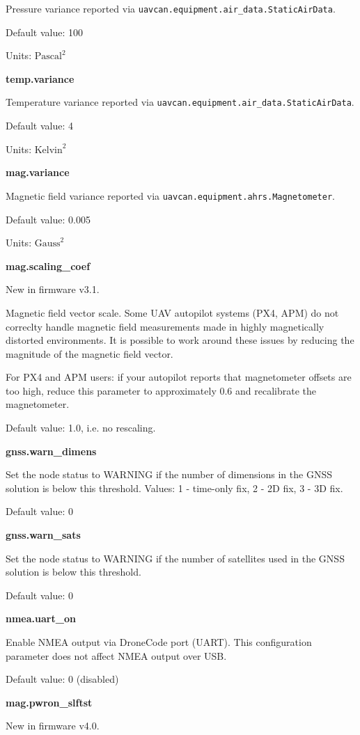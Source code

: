 \documentclass{zubaxdoc}
\begin{document}
Pressure variance reported via \texttt{uavcan.equipment.air{\_}data.StaticAirData}.

Default value: 100

Units: $\text{Pascal}^2$

\textbf{temp.variance}

Temperature variance reported via \texttt{uavcan.equipment.air{\_}data.StaticAirData}.

Default value: 4

Units: $\text{Kelvin}^2$

\textbf{mag.variance}

Magnetic field variance reported via \texttt{uavcan.equipment.ahrs.Magnetometer}.

Default value: 0.005

Units: $\text{Gauss}^2$

\textbf{mag.scaling{\_}coef}

New in firmware v3.1.

Magnetic field vector scale. Some UAV autopilot systems (PX4, APM) do not correclty handle magnetic field measurements made in highly magnetically distorted environments. It is possible to work around these issues by reducing the magnitude of the magnetic field vector.

For PX4 and APM users: if your autopilot reports that magnetometer offsets are too high, reduce this parameter to approximately 0.6 and recalibrate the magnetometer.

Default value: 1.0, i.e. no rescaling.

\textbf{gnss.warn{\_}dimens}

Set the node status to WARNING if the number of dimensions in the GNSS solution is below this threshold. Values: 1 - time-only fix, 2 - 2D fix, 3 - 3D fix.

Default value: 0

\textbf{gnss.warn{\_}sats}

Set the node status to WARNING if the number of satellites used in the GNSS solution is below this threshold.

Default value: 0

\textbf{nmea.uart{\_}on}

Enable NMEA output via DroneCode port (UART). This configuration parameter does not affect NMEA output over USB.

Default value: 0 (disabled)

\textbf{mag.pwron{\_}slftst}

New in firmware v4.0.
\end{document}
